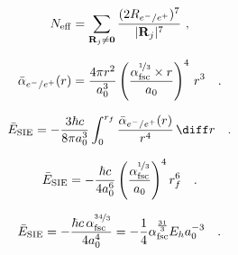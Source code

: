 \begin{equation}
N_{\rm eff} = \sum\limits_{\mathbf{R}_j \ne \mathbf{0}}
\frac{(2 R_{e^-/e^+})^7}{|\mathbf{R}_j|^7}\ ,
\label{lattice_sum}
\end{equation}

\begin{equation}
\label{eqRadPol}
\bar{\alpha}_{e^-/e^+}(r) = \frac{4 \pi r^2}{a_0^3} \left(\frac{\alpha_{\rm fsc}^{\nicefrac{1}{3}} \times r}{a_0}\right)^4\, r^3 \quad . 
\end{equation}

\begin{equation}
\bar{E}_{\rm{SIE}} = - \frac{3 \hbar c}{8 \pi a_0^3} \int_{0}^{r_{f}} \frac{\bar{\alpha}_{e^-/e^+}(r)}{r^4}\, \diff r \quad .
\label{E_SIE}
\end{equation}

\begin{equation}
\bar{E}_{\rm{SIE}} = - \frac{\hbar c}{4 a_0^6} 
\left(\frac{\alpha_{\rm fsc}^{\nicefrac{1}{3}}}{a_0}\right)^4
r_f^6 \quad .
\label{E_SIE_r_f}
\end{equation}

\begin{equation}
\bar{E}_{\rm{SIE}} = - \frac{\hbar c\, \alpha_{\rm fsc}^{\nicefrac{34}{3}}}{4 a_0^4} = - \frac{1}{4} 
\alpha_{\rm fsc}^{\frac{31}{3}} E_h a_0^{-3} \quad .
\label{eqLambda}
\end{equation}

